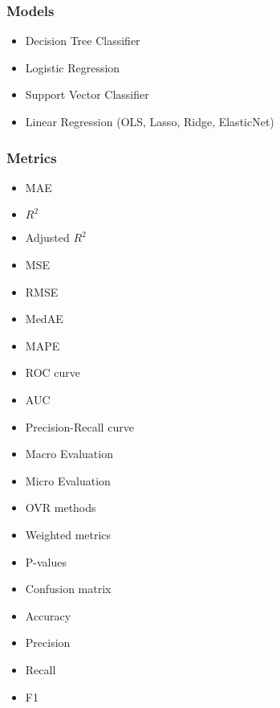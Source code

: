 \subsubsection{Models}

\begin{itemize}
    \item Decision Tree Classifier
    \item Logistic Regression
    \item Support Vector Classifier
    \item Linear Regression (OLS, Lasso, Ridge, ElasticNet)
\end{itemize}


\subsubsection{Metrics}

\begin{itemize}
    \item MAE
    \item $R^2$
    \item Adjusted $R^2$
    \item MSE
    \item RMSE
    \item MedAE
    \item MAPE
    \item ROC curve
    \item AUC
    \item Precision-Recall curve
    \item Macro Evaluation
    \item Micro Evaluation
    \item OVR methods
    \item Weighted metrics
    \item P-values
    \item Confusion matrix
    \item Accuracy
    \item Precision
    \item Recall
    \item F1
\end{itemize}